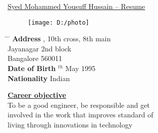 \documentclass[10pt]{article}
\begin{document}
	
\begin{tabbing}
	\hspace{1cm}
	\underline{\LARGE{Syed Mohammed Yousuff Hussain -- Resume}} %
\end{tabbing}

	\begin{figure}[h]
		\texttt{[image: D:/photo]}
	\end{figure}
	
\parbox{1.5\textwidth}{ %
	\begin{tabbing} %
		\hspace{3cm} \= \hspace{4cm} \= \kill %
		{\bf Address} , 10th cross, 8th main\\ %
		\> Jayanagar 2nd block\\ %
		\> Bangalore 560011\\ %
		{\bf Date of Birth} $^{th}$ May 1995  \\ %
		{\bf Nationality} \> Indian %
	\end{tabbing}}
	\hfill %
	
		\underline{\textbf{\Large{Career objective}}}\\
		
		To be a good engineer, be responsible and get\\ involved in the work that improves standard of\\ living through innovations in technology\\
	
\end{document}
